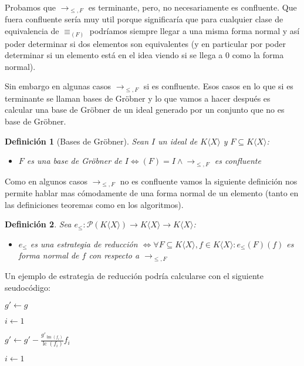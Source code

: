 \documentclass{report}
\theoremstyle{customstyle}
\newtheorem{definition}{Definición}[chapter]
\theoremstyle{factstyle}
\DeclareMathOperator{\sop}{sop}
\DeclareMathOperator{\lm}{lm}
\DeclareMathOperator{\lc}{lc}
\begin{document}
Probamos que $→_{≤, F}$ es terminante, pero, no necesariamente es confluente. Que fuera confluente sería muy util porque significaría que para cualquier clase de equivalencia de $≡_{(F)}$ podríamos siempre llegar a una misma forma normal y así poder determinar si dos elementos son equivalentes (y en particular por poder determinar si un elemento está en el idea viendo si se llega a $0$ como la forma normal).

Sin embargo en algunas casos $→_{≤, F}$ si es confluente. Esos casos en lo que si es terminante se llaman bases de Gröbner y lo que vamos a hacer después es calcular una base de Gröbner de un ideal generado por un conjunto que no es base de Gröbner.

\begin{definition}[Bases de Gröbner]\label{def:base de Gröbner}
  Sean $I$ un ideal de $K⟨X⟩$ y $F ⊆ K⟨X⟩$:
  \begin{itemize}
    \item $F$ es una base de Gröbner de $I ⇔ (F) = I ∧ →_{≤, F}$ es confluente
  \end{itemize}
\end{definition}

Como en algunos casos $→_{≤, F}$ no es confluente vamos la siguiente definición nos permite hablar mas cómodamente de una forma normal de un elemento (tanto en las definiciones teoremas como en los algoritmos).

\begin{definition}
  Sea $e_≤ : 𝒫(K⟨X⟩) → K⟨X⟩ → K⟨X⟩$:
  \begin{itemize}
    \item $e_≤$ es una estrategia de reducción $⇔ ∀F ⊆ K⟨X⟩, f ∈ K⟨X⟩ : e_≤(F)(f)$ es forma normal de $f$ con respecto a $→_{≤, F}$
  \end{itemize}
\end{definition}

Un ejemplo de estrategia de reducción podría calcularse con el siguiente seudocódigo:

\begin{algorithm}[H] %
  \caption{Ejemplo de estrategia de reducción}\label{alg:estrategia de reducción}
  $g' ← g$

  $i ← 1$

   {
     {
      \If{$f_i ∈ \sop(g')$} {
        $g' ← g' - \frac{g'_{\lm(f_i)}}{\lc(f_i)}f_i$

        $i ← 1$

        \Break
      }
    }
  }
\end{algorithm}
\end{document}
